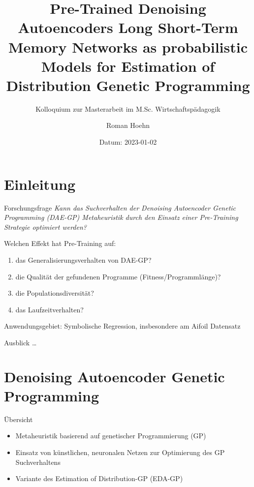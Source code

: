 \documentclass[
  ignorenonframetext,
]{beamer}
\title{Pre-Trained Denoising Autoencoders Long Short-Term Memory
Networks as probabilistic Models for Estimation of Distribution Genetic
Programming}
\subtitle{Kolloquium zur Masterarbeit im M.Sc. Wirtschaftspädagogik}
\author{Roman Hoehn}
\date{Datum: 2023-01-02}
\institute{Johannes Gutenberg-Universität Mainz}
\providecommand{\tightlist}{%
  \setlength{\itemsep}{0pt}\setlength{\parskip}{0pt}}
\begin{document}
\frame{\titlepage}

\begin{frame}[allowframebreaks]
  \tableofcontents[hideallsubsections]
\end{frame}
\hypertarget{einleitung}{%
\section{Einleitung}\label{einleitung}}

\begin{frame}{Forschungsfrage}
\protect\hypertarget{forschungsfrage}{}
\emph{Kann das Suchverhalten der Denoising Autoencoder Genetic
Programming (DAE-GP) Metaheuristik durch den Einsatz einer Pre-Training
Strategie optimiert werden?}

Welchen Effekt hat Pre-Training auf:

\begin{enumerate}
\tightlist
\item
  das Generalisierungsverhalten von DAE-GP?
\item
  die Qualität der gefundenen Programme (Fitness/Programmlänge)?
\item
  die Populationsdiversität?
\item
  das Laufzeitverhalten?
\end{enumerate}

Anwendungsgebiet: Symbolische Regression, insbesondere am Aifoil
Datensatz
\end{frame}

\begin{frame}{Ausblick}
\protect\hypertarget{ausblick}{}
\ldots{}
\end{frame}

\hypertarget{denoising-autoencoder-genetic-programming}{%
\section{Denoising Autoencoder Genetic
Programming}\label{denoising-autoencoder-genetic-programming}}

\begin{frame}{Übersicht}
\protect\hypertarget{uxfcbersicht}{}
\begin{itemize}
\tightlist
\item
  Metaheuristik basierend auf genetischer Programmierung (GP)
\item
  Einsatz von künstlichen, neuronalen Netzen zur Optimierung des GP
  Suchverhaltens
\item
  Variante des Estimation of Distribution-GP (EDA-GP)
\end{itemize}
\end{frame}
\end{document}
